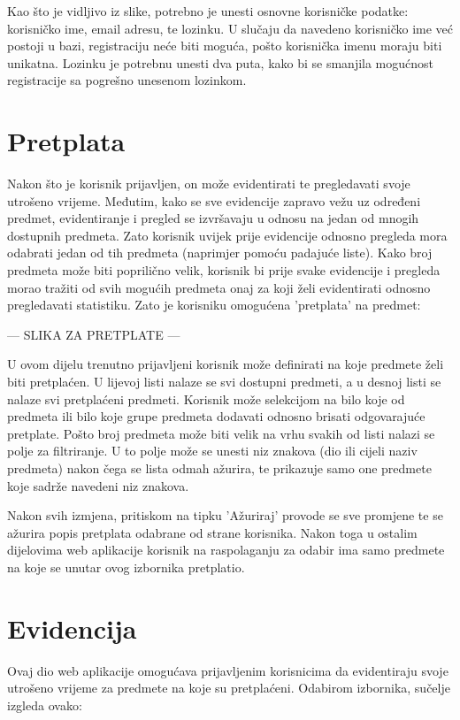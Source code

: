 \documentclass[times, utf8, zavrsni]{fer}
\begin{document}
Kao što je vidljivo iz slike, potrebno je unesti osnovne korisničke podatke: korisničko ime, email adresu, te lozinku. U slučaju da navedeno korisničko ime već postoji u bazi, registraciju neće biti moguća, pošto korisnička imenu moraju biti unikatna. Lozinku je potrebnu unesti dva puta, kako bi se smanjila mogućnost registracije sa pogrešno unesenom lozinkom.

\section{Pretplata}
Nakon što je korisnik prijavljen, on može evidentirati te pregledavati svoje utrošeno vrijeme. Međutim, kako se sve evidencije zapravo vežu uz određeni predmet, evidentiranje i pregled se izvršavaju u odnosu na jedan od mnogih dostupnih predmeta. Zato korisnik uvijek prije evidencije odnosno pregleda mora odabrati jedan od tih predmeta (naprimjer pomoću padajuće liste). Kako broj predmeta može biti poprilično velik, korisnik bi prije svake evidencije i pregleda morao tražiti od svih mogućih predmeta onaj za koji želi evidentirati odnosno pregledavati statistiku. Zato je korisniku omogućena 'pretplata' na predmet:

--- SLIKA ZA PRETPLATE ---

U ovom dijelu trenutno prijavljeni korisnik može definirati na koje predmete želi biti pretplaćen. U lijevoj listi nalaze se svi dostupni predmeti, a u desnoj listi se nalaze svi pretplaćeni predmeti. Korisnik može selekcijom na bilo koje od predmeta ili bilo koje grupe predmeta dodavati odnosno brisati odgovarajuće pretplate. Pošto broj predmeta može biti velik na vrhu svakih od listi nalazi se polje za filtriranje. U to polje može se unesti niz znakova (dio ili cijeli naziv predmeta) nakon čega se lista odmah ažurira, te prikazuje samo one predmete koje sadrže navedeni niz znakova.

Nakon svih izmjena, pritiskom na tipku 'Ažuriraj' provode se sve promjene te se ažurira popis pretplata odabrane od strane korisnika. Nakon toga u ostalim dijelovima web aplikacije korisnik na raspolaganju za odabir ima samo predmete na koje se unutar ovog izbornika pretplatio.

\section{Evidencija}
Ovaj dio web aplikacije omogućava prijavljenim korisnicima da evidentiraju svoje utrošeno vrijeme za predmete na koje su pretplaćeni. Odabirom izbornika, sučelje izgleda ovako:
\end{document}
